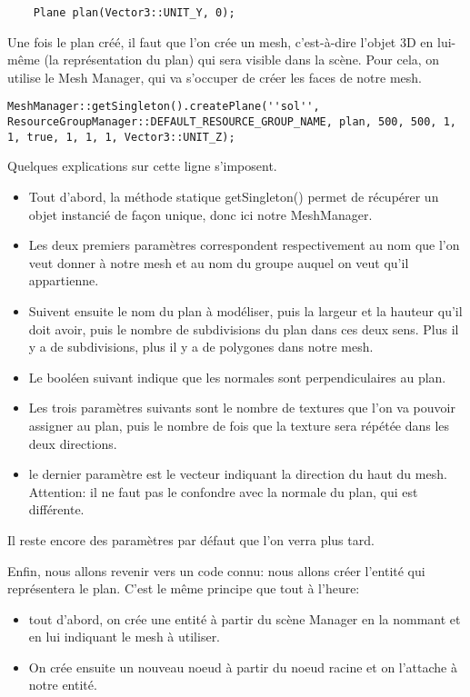 \documentclass[10pt,a4paper]{report}
\begin{document}
\begin{lstlisting}
	Plane plan(Vector3::UNIT_Y, 0);
\end{lstlisting}

Une fois le plan cr\'e\'e, il faut que l'on cr\'ee un mesh, c'est-\`{a}-dire l'objet 3D en lui-m\^eme (la repr\'esentation du plan) qui sera visible dans la sc\`ene.
Pour cela, on utilise le Mesh Manager, qui va s'occuper de cr\'eer les faces de notre mesh.

\begin{lstlisting}
MeshManager::getSingleton().createPlane(''sol'', ResourceGroupManager::DEFAULT_RESOURCE_GROUP_NAME, plan, 500, 500, 1, 1, true, 1, 1, 1, Vector3::UNIT_Z);
\end{lstlisting}

Quelques explications sur cette ligne s'imposent. 
\begin{itemize}
\item Tout d'abord, la m\'ethode statique getSingleton() permet de r\'ecup\'erer un objet instanci\'e de fa\c{c}on unique, donc ici notre MeshManager.
\item Les deux premiers param\`etres correspondent respectivement au nom que l'on veut donner \`{a} notre mesh et au nom du groupe auquel on veut qu'il appartienne. 
\item Suivent ensuite le nom du plan \`{a} mod\'eliser, puis la largeur et la hauteur qu'il doit avoir, puis le nombre de subdivisions du plan dans ces deux sens. Plus il y a de subdivisions, plus il y a de polygones dans notre mesh. 
\item Le bool\'een suivant indique que les normales sont perpendiculaires au plan.
\item Les trois param\`etres suivants sont le nombre de textures que l'on va pouvoir assigner au plan, puis le nombre de fois que la texture sera r\'ep\'et\'ee dans les deux directions. 
\item le dernier param\`etre est le vecteur indiquant la direction du haut du mesh. Attention: il ne faut pas le confondre avec la normale du plan, qui est diff\'erente.
\end{itemize}

Il reste encore des param\`etres par d\'efaut que l'on verra plus tard.

Enfin, nous allons revenir vers un code connu: nous allons cr\'eer l'entit\'e qui repr\'esentera le plan. C'est le m\^eme principe que tout \`{a} l'heure:
\begin{itemize} 
\item tout d'abord, on cr\'ee une entit\'e \`{a} partir du sc\`ene Manager en la nommant et en lui indiquant le mesh \`{a} utiliser. 
\item On cr\'ee ensuite un nouveau noeud \`{a} partir du noeud racine et on l'attache \`{a} notre entit\'e.
\end{itemize}
\end{document}

